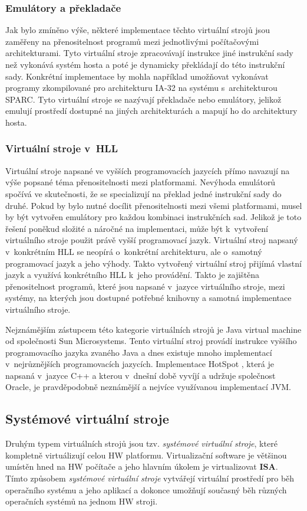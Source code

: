 \subsubsection{Emulátory a překladače}
\label{chapter:virtualization:clasification:process_vm:emulation}
Jak bylo zmíněno výše, některé implementace těchto virtuální strojů jsou zaměřeny na přenositelnost programů mezi jednotlivými
počítačovými architekturami. Tyto virtuální stroje zpracovávají instrukce jiné instrukční sady než vykonává systém hosta a poté
je dynamicky překládají do této instrukční sady. Konkrétní implementace by mohla například umožňovat vykonávat programy zkompilované
pro architekturu IA-32 na systému s~architekturou SPARC. Tyto virtuální stroje se nazývají překladače nebo emulátory, jelikož
emulují prostředí dostupné na jiných architekturách a mapují ho do architektury hosta.    
\subsubsection{Virtuální stroje v~HLL}
\label{chapter:virtualization:clasification:process_vm:hll_vm}
Virtuální stroje napsané ve vyšších programovacích jazycích přímo navazují na výše popsané téma přenositelnosti mezi platformami.
Nevýhoda emulátorů spočívá ve skutečnosti, že se specializují na překlad jedné instrukční sady do druhé. Pokud by bylo nutné 
docílit přenositelnosti mezi všemi platformami, musel by být vytvořen emulátory pro každou kombinaci instrukčních sad. Jelikož
je toto řešení poněkud složité a náročné na implementaci, může být k~vytvoření virtuálního stroje použit právě vyšší programovací 
jazyk. Virtuální stroj napsaný v~konkrétním HLL se neopírá o~konkrétní architekturu, ale o~samotný programovací jazyk a jeho výhody.
Takto vytvořený virtuální stroj přijímá vlastní jazyk a využívá konkrétního HLL k~jeho provádění. Takto je zajištěna přenositelnost
programů, které jsou napsané v~jazyce virtuálního stroje, mezi systémy, na kterých jsou dostupné potřebné knihovny a samotná implementace virtuálního stroje.

Nejznámějším zástupcem této kategorie virtuálních strojů je Java virtual machine od společnosti Sun Microsystems. Tento virtuální
stroj provádí instrukce vyššího programovacího jazyka zvaného Java a dnes existuje mnoho implementací v~nejrůznějších programovacích
jazycích. Implementace HotSpot \cite{article:java:hotspot}, která je napsaná v~jazyce C++ a kterou v~dnešní době vyvíjí a 
udržuje společnost Oracle, je pravděpodobně neznámější a nejvíce využívanou implementací JVM.   
\subsection{Systémové virtuální stroje}
\label{chapter:virtualization:clasification:system_vm}
Druhým typem virtuálních strojů jsou tzv. \textit{systémové virtuální stroje}, které kompletně virtuálizují celou HW platformu.
Virtualizační software je většinou umístěn hned na HW počítače a jeho hlavním úkolem je virtualizovat \textbf{ISA}. Tímto
způsobem \textit{systémové virtuální stroje} vytvářejí virtuální prostředí pro běh operačního systému a jeho aplikací a dokonce
umožňují současný běh různých operačních systémů na jednom HW stroji.
